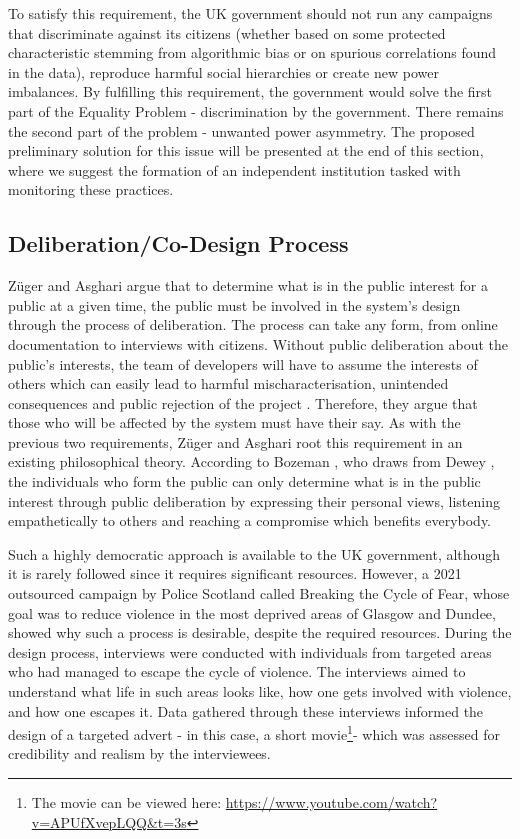 \documentclass[preprint]{acmart}
\begin{document}
To satisfy this requirement, the UK government should not run any campaigns that discriminate against its citizens (whether based on some protected characteristic stemming from algorithmic bias or on spurious correlations found in the data), reproduce harmful social hierarchies or create new power imbalances. By fulfilling this requirement, the government would solve the first part of the Equality Problem - discrimination by the government. There remains the second part of the problem - unwanted power asymmetry. The proposed preliminary solution for this issue will be presented at the end of this section, where we suggest the formation of an independent institution tasked with monitoring these practices.



\subsection{Deliberation/Co-Design Process}

Züger and Asghari \cite{zuger2022} argue that to determine what is in the public interest for a public at a given time, the public must be involved in the system's design through the process of deliberation. The process can take any form, from online documentation to interviews with citizens. Without public deliberation about the public's interests, the team of developers will have to assume the interests of others which can easily lead to harmful mischaracterisation, unintended consequences and public rejection of the project \cite{zuger2022}. Therefore, they argue that those who will be affected by the system must have their say. As with the previous two requirements, Züger and Asghari root this requirement in an existing philosophical theory. According to Bozeman \cite{bozeman2007}, who draws from Dewey \cite{Dewey2012}, the individuals who form the public can only determine what is in the public interest through public deliberation by expressing their personal views, listening empathetically to others and reaching a compromise which benefits everybody. 

Such a highly democratic approach is available to the UK government, although it is rarely followed since it requires significant resources. However, a 2021 outsourced campaign by Police Scotland called Breaking the Cycle of Fear, whose goal was to reduce violence in the most deprived areas of Glasgow and Dundee, showed why such a process is desirable, despite the required resources. During the design process, interviews were conducted with individuals from targeted areas who had managed to escape the cycle of violence. The interviews aimed to understand what life in such areas looks like, how one gets involved with violence, and how one escapes it. Data gathered through these interviews informed the design of a targeted advert - in this case, a short movie\footnote{The movie can be viewed here: \url{https://www.youtube.com/watch?v=APUfXvepLQQ\&t=3s}}- which was assessed for credibility and realism by the interviewees. 
\end{document}

